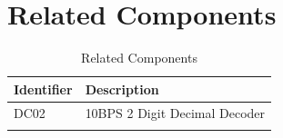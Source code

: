 \documentclass[10pt]{datasheet}
\begin{document}
\newpage
\section{Related Components}
\begin{table}[h]
    \caption{Related Components}
    \begin{tabularx}{\textwidth}{ l | l }
        \thickhline
        \textbf{Identifier} & \textbf{Description} \\
        \hline
        DC02 & 10BPS 2 Digit Decimal Decoder \\
        \thickhline
    \end{tabularx}
\end{table}
\end{document}
